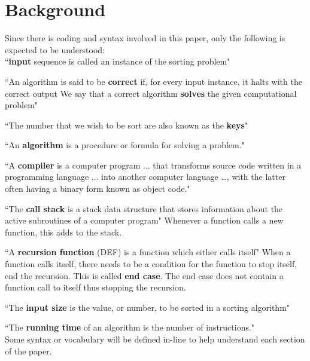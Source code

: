 \documentclass[12pt]{article}
\begin{document}
	\section{Background} %
	
	Since there is coding and syntax involved in this paper, only the following is expected to be understood:\\
	
	``\textbf{input} sequence is called an instance of the sorting problem"\cite[p.~5]{intro}
	
	``An algorithm is said to be \textbf{correct} if, for every input instance, it halts with the correct output
	We say that a correct algorithm \textbf{solves} the given computational problem"\cite[p.~6]{intro}
	
	``The number that we wish to be sort are also known as the \textbf{keys}"\cite[p.~16]{intro}
	
	``An \textbf{algorithm} is a procedure or formula for solving a problem."\cite{intro}
	
	``A \textbf{compiler} is a computer program ... that transforms source code written in a programming language ... into another computer language …, with the latter often having a binary form known as object code."\cite{intro}
	
	``The \textbf{call stack} is a stack data structure that stores information about the active subroutines of a computer program"\cite{wiki-callStack} Whenever a function calls a new function, this adds to the stack.
	
	``A \textbf{recursion function} (DEF) is a function which either calls itself"\cite{wiki-recursiveFunction} When a function calls itself, there needs to be a condition for the function to stop itself, end the recursion.
	This is called \textbf{end case}.
	The end case does not contain a function call to itself thus stopping the recursion.
	
	``The \textbf{input size} is the value, or number, to be sorted in a sorting algorithm"\cite{intro}
	
	``The \textbf{running time} of an algorithm is the number of instructions."\cite{intro}\\
	
	Some syntax or vocabulary will be defined in-line to help understand each section of the paper.
	
\end{document}
